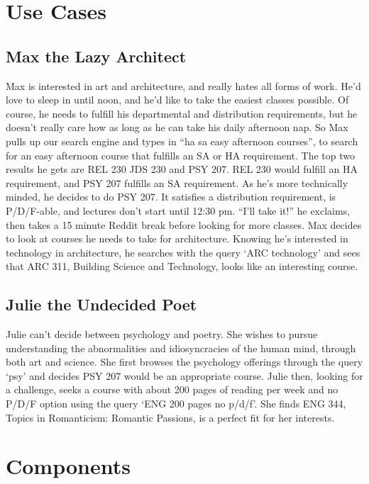 \documentclass[12pt,letterpaper]{article}
\begin{document}
\section{Use Cases}
\subsection{Max the Lazy Architect}
Max is interested in art and architecture, and really hates all forms of work. He'd love to sleep in until noon, and he'd like to take the easiest classes possible. Of course, he needs to fulfill his departmental and distribution requirements, but he doesn't really care how as long as he can take his daily afternoon nap. So Max pulls up our search engine and types in ``ha sa easy afternoon courses'', to search for an easy afternoon course that fulfills an SA or HA requirement. The top two results he gets are  REL 230 JDS 230 and PSY 207. REL 230 would fulfill an HA requirement, and PSY 207 fulfills an SA requirement. As he's more technically minded, he decides to do PSY 207. It satisfies a distribution requirement, is P/D/F-able, and lectures don't start until 12:30 pm. ``I'll take it!'' he exclaims, then takes a 15 minute Reddit break before looking for more classes. Max decides to look at courses he needs to take for architecture. Knowing he's interested in technology in architecture, he searches with the query `ARC technology' and sees that ARC 311, Building Science and Technology, looks like an interesting course.
		
\subsection{Julie the Undecided Poet}
Julie can't decide between psychology and poetry. She wishes to pursue understanding the abnormalities and idiosyncracies of the human mind, through both art and science. She first browses the psychology offerings through the query `psy' and decides PSY 207 would be an appropriate course. Julie then, looking for a challenge, seeks a course with about 200 pages of reading per week and no P/D/F option using the query `ENG 200 pages no p/d/f'. She finds ENG 344, Topics in Romanticism: Romantic Passions, is a perfect fit for her interests.  

\section{Components}
\end{document}
